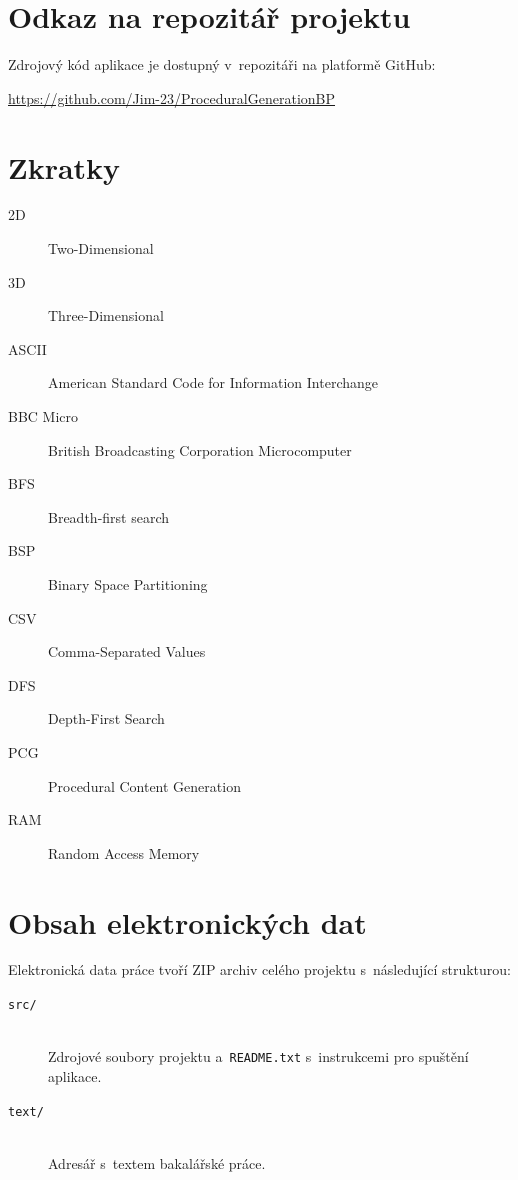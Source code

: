 \documentclass[
   program=itk,
   biblatex,
   figures=true,
   tables=true,
   glossaries,
   index
]{kidiplom}
\begin{document}
\appendix

\section{Odkaz na repozitář projektu}

Zdrojový kód aplikace je dostupný v~repozitáři na platformě GitHub:

\begin{center}
\url{https://github.com/Jim-23/ProceduralGenerationBP}
\end{center}

\section{Zkratky}
\begin{description}
\item[2D] Two-Dimensional
\item[3D] Three-Dimensional
\item[ASCII] American Standard Code for Information Interchange
\item[BBC Micro] British Broadcasting Corporation Microcomputer
\item[BFS] Breadth-first search
\item[BSP] Binary Space Partitioning
\item[CSV] Comma-Separated Values
\item[DFS] Depth-First Search
\item[PCG] Procedural Content Generation
\item[RAM] Random Access Memory
\end{description}

\section{Obsah elektronických dat} \label{sec:ObsahData}

Elektronická data práce tvoří ZIP archiv celého projektu s~následující strukturou:

\begin{description}

\item[\texttt{src/}] \hfill \\
  Zdrojové soubory projektu a~\texttt{README.txt} s~instrukcemi pro spuštění aplikace.

\item[\texttt{text/}] \hfill \\
  Adresář s~textem bakalářské práce.

\end{description}
\end{document}

